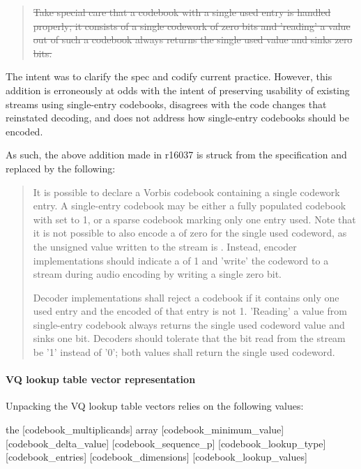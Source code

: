 \blockquote{\sout{Take special care that a codebook with a single used
    entry is handled properly; it consists of a single codework of
    zero bits and ’reading’ a value out of such a codebook always
    returns the single used value and sinks zero bits.
}} 

The intent was to clarify the spec and codify current practice.
However, this addition is erroneously at odds with the intent of preserving
usability of existing streams using single-entry codebooks, disagrees
with the code changes that reinstated decoding, and does not address how
single-entry codebooks should be encoded.

As such, the above addition made in r16037 is struck from the
specification and replaced by the following:

\blockquote{It is possible to declare a Vorbis codebook containing a
  single codework entry.  A single-entry codebook may be either a
  fully populated codebook with  set to
  1, or a sparse codebook marking only one entry used.  Note that it
  is not possible to also encode a  of
  zero for the single used codeword, as the unsigned value written to
  the stream is .  Instead, encoder
  implementations should indicate a  of 1
  and 'write' the codeword to a stream during audio encoding by
  writing a single zero bit.

  Decoder implementations shall reject a codebook if it contains only
  one used entry and the encoded  of that
  entry is not 1.  'Reading' a value from single-entry codebook always
  returns the single used codeword value and sinks one bit.  Decoders
  should tolerate that the bit read from the stream be '1' instead of
  '0'; both values shall return the single used codeword.}

\paragraph{VQ lookup table vector representation}

Unpacking the VQ lookup table vectors relies on the following values:
\begin{programlisting}
the [codebook\_multiplicands] array
[codebook\_minimum\_value]
[codebook\_delta\_value]
[codebook\_sequence\_p]
[codebook\_lookup\_type]
[codebook\_entries]
[codebook\_dimensions]
[codebook\_lookup\_values]
\end{programlisting}

